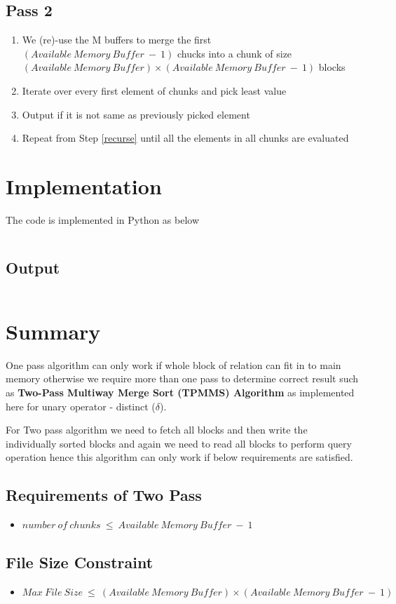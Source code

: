 \documentclass[paper=letter, fontsize=12pt]{article}
\begin{document}
\subsection{Pass 2}
	\begin{enumerate}
		\item We (re)-use the M buffers to merge the first $(Available\ Memory\ Buffer\ -\ 1)$ chucks into a chunk of size $(Available\ Memory\ Buffer)\times(Available\ Memory\ Buffer\ -\ 1)$ blocks
		\item\label{recurse} Iterate over every first element of chunks and pick least value
		\item Output if it is not same as previously picked element
		\item Repeat from Step \ref{recurse} until all the elements in all chunks are evaluated
	\end{enumerate}


\section{Implementation}
The code is implemented in Python as below

\inputminted{python}{../two_pass_sort_based.py}

\subsection{Output}
\inputminted{text}{../output.txt}


\section{Summary}
One pass algorithm can only work if whole block of relation can fit in to main memory otherwise we require more than one pass to determine correct result such as \textbf{Two-Pass Multiway Merge Sort (TPMMS) Algorithm} as implemented here for unary operator - distinct ($\delta$).

For Two pass algorithm we need to fetch all blocks and then write the individually sorted blocks and again we need to read all blocks to perform query operation hence this algorithm can only work if below requirements are satisfied.

\subsection{Requirements of Two Pass}

\begin{itemize}
	\item $number\ of\ chunks\ \leq\ Available\ Memory\ Buffer\ -\ 1$
\end{itemize}

\subsection{File Size Constraint}
\begin{itemize}
	\item $Max\ File\ Size\ \leq\ (Available\ Memory\ Buffer)\times(Available\ Memory\ Buffer\ -\ 1)$
\end{itemize}
\end{document}

